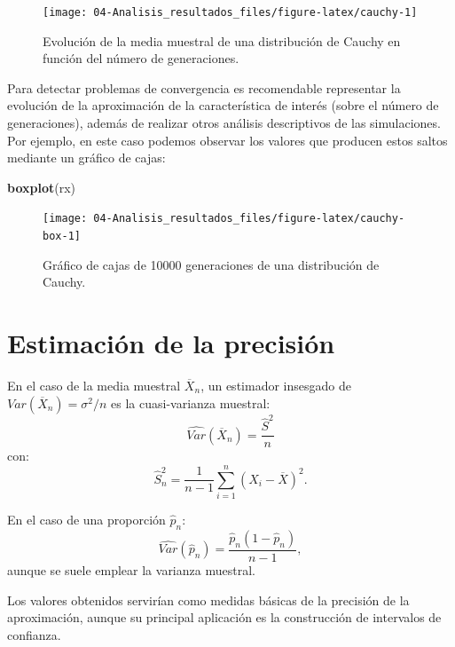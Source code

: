 \documentclass[
]{book}
\newenvironment{Shaded}{\begin{snugshade}}{\end{snugshade}}
\newcommand{\KeywordTok}[1]{\textcolor[rgb]{0.13,0.29,0.53}{\textbf{#1}}}
\newcommand{\NormalTok}[1]{#1}
\theoremstyle{break}
\theoremstyle{definition}
\theoremstyle{definition}
\theoremstyle{definition}
\theoremstyle{remark}
\begin{document}
\begin{figure}[!htb]

{\centering \texttt{[image: 04-Analisis\_resultados\_files/figure-latex/cauchy-1]} 

}

\caption{Evolución de la media muestral de una distribución de Cauchy en función del número de generaciones.}\label{fig:cauchy}
\end{figure}

Para detectar problemas de convergencia es recomendable representar la evolución de la aproximación de la característica de interés (sobre el número de generaciones),
además de realizar otros análisis descriptivos de las simulaciones.
Por ejemplo, en este caso podemos observar los valores que producen estos saltos mediante un gráfico de cajas:

\begin{Shaded}
\begin{Highlighting}[]
\KeywordTok{boxplot}\NormalTok{(rx)}
\end{Highlighting}
\end{Shaded}

\begin{figure}[!htb]

{\centering \texttt{[image: 04-Analisis\_resultados\_files/figure-latex/cauchy-box-1]} 

}

\caption{Gráfico de cajas de 10000 generaciones de una distribución de Cauchy.}\label{fig:cauchy-box}
\end{figure}

\hypertarget{estimaciuxf3n-de-la-precisiuxf3n}{%
\section{Estimación de la precisión}\label{estimaciuxf3n-de-la-precisiuxf3n}}

En el caso de la media muestral \(\overline{X}_{n}\), un estimador
insesgado de \(Var\left( \overline{X}_{n}\right) =\sigma ^{2}/n\) es la cuasi-varianza muestral:
\[\widehat{Var}\left( \overline{X}_{n}\right) =\frac{\widehat{S}^{2}}{n}\]
con:
\[\widehat{S}_{n}^{2}=\dfrac{1}{n-1}\sum\limits_{i=1}^{n}\left( X_{i}-
\overline{X}\right) ^{2}.\]

En el caso de una proporción \(\hat{p}_{n}\):
\[\widehat{Var}\left( \hat{p}_{n}\right) 
=\frac{\hat{p}_{n}(1-\hat{p}_{n})}{n-1},\]
aunque se suele emplear la varianza muestral.

Los valores obtenidos servirían como medidas básicas de la precisión
de la aproximación, aunque su principal aplicación es la
construcción de intervalos de confianza.
\end{document}
